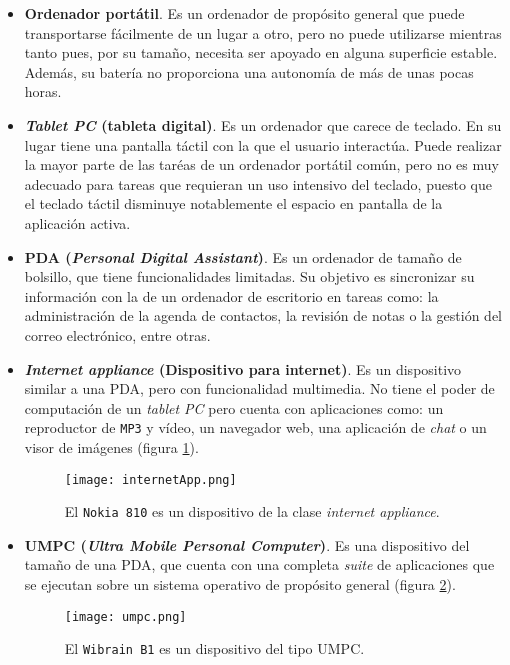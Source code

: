 \begin{itemize}
\item \textbf{Ordenador portátil}. Es un ordenador de propósito general
que puede transportarse fácilmente de un lugar a otro, pero no puede utilizarse 
mientras tanto pues, por su tamaño, necesita ser apoyado en alguna superficie 
estable. Además, su batería no proporciona una autonomía de más de unas pocas
horas.
\item \textbf{\emph{Tablet PC} (tableta digital)}. Es un ordenador que carece 
de teclado. En su lugar tiene una pantalla táctil con la que el usuario 
interactúa. Puede realizar la mayor parte de las taréas de un ordenador 
portátil común, pero no es muy adecuado para tareas que requieran un uso 
intensivo del teclado, puesto que el teclado táctil disminuye notablemente el 
espacio en pantalla de la aplicación activa.
\item \textbf{\acs{PDA} (\emph{Personal Digital Assistant})}. Es un
ordenador de tamaño de bolsillo, que tiene funcionalidades limitadas. Su
objetivo es sincronizar su información con la de un ordenador de escritorio
en tareas como: la administración de la agenda de contactos, la revisión de
notas o la gestión del correo electrónico, entre otras.
\item \textbf{\emph{Internet appliance} (Dispositivo para internet)}. Es un 
dispositivo similar a una \acs{PDA}, pero con funcionalidad multimedia. No 
tiene el poder de computación de un \emph{tablet PC} pero cuenta con 
aplicaciones como: un reproductor de \texttt{MP3} y vídeo, un navegador web, 
una aplicación de \emph{chat} o un visor de imágenes (figura
\ref{fig:internetApp}).

  \begin{figure}[H]
    \begin{center}
      \texttt{[image: internetApp.png]}
      \caption{El \texttt{Nokia 810} es un dispositivo de la clase
      \emph{internet appliance}.}
      \label{fig:internetApp}
    \end{center}
  \end{figure}

\item \textbf{\acs{UMPC} (\emph{Ultra Mobile Personal Computer})}. Es una
dispositivo del tamaño de una \acs{PDA}, que cuenta con una completa 
\emph{suite} de aplicaciones que se ejecutan sobre un sistema operativo de 
propósito general (figura \ref{fig:umpc}).

  \begin{figure}[H]
    \begin{center}
      \texttt{[image: umpc.png]}
      \caption{El \texttt{Wibrain B1} es un dispositivo del tipo \acs{UMPC}.}
      \label{fig:umpc}
    \end{center}
  \end{figure}


\end{itemize}
